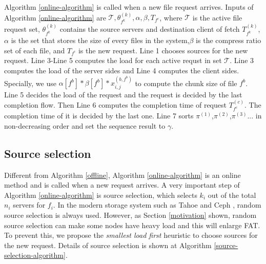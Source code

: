 \documentclass{IEEEtran}
\begin{document}
 Algorithm \ref{online-algorithm} is called when a new file request arrives.
 Inputs of Algorithm \ref{online-algorithm} are $\mathcal{T},\theta_{f^k}^{(k)},\alpha,\beta,T_{f^c}$, where $\mathcal{T}$ is the active file request set, 
 $\theta_{f^k}^{(k)}$ contains the source servers and destination client of fetch $T^{(k)}_{f^k}$,
 $\alpha$ is the set that stores the size of every files in the system,$\beta$ is the compress ratio set of each file,
 and $T_{f^c}$ is the new request. 
 Line 1 chooses sources for the new request.
 Line 3-Line 5 computes the load for each active requst in set $\mathcal{T}$.
 Line 3 computes the load of the server sides and Line 4 computes the client sides.
 Specially, we use $\alpha[f^b]*\beta[f^b]*x_{i,j}^{(b,f^b)}$ to compute the chunk size of file $f^b$.
 Line 5 decides the load of the request and the request is decided by the last completion flow.
 Then Line 6 computes the completion time of request $T^{(c)}_{f^c}$. 
 The completion time of it is decided by the last one.
 Line 7 sorts $\pi^{(1)}$,$\pi^{(2)}$,$\pi^{(3)}$... in non-decreasing order and set the sequence result to $\gamma$.
  
 \subsection{Source selection}
Different from Algorithm \ref{offline},  Algorithm \ref{online-algorithm} is an online method and is called when a new request arrives. 
A very important step of Algorithm \ref{online-algorithm} is source selection, which selects $k_i$ out of the total $n_i$ servers for $f_i$. 
In the modern storage system such as Tahoe \cite{Tahoe} and Ceph \cite{Ceph},  random source selection is always used.
However, as Section \ref{motivation} shown, random source selection can make some nodes have heavy load and this will enlarge FAT.
To prevent this, we propose the {\em smallest load  first} heuristic to choose sources for the new request.
Details of source selection is shown at Algorithm \ref{source-selection-algorithm}.
\end{document}
